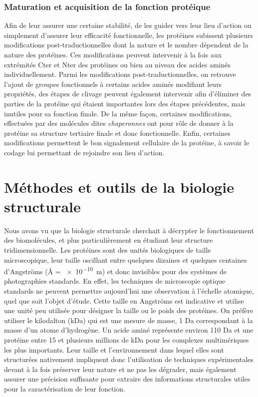 \subsubsection{Maturation et acquisition de la fonction protéique}

Afin de leur assurer une certaine stabilité, de les guider vers leur lieu d'action ou simplement d'assurer leur efficacité fonctionnelle, les protéines subissent plusieurs modifications post-traductionnelles dont la nature et le nombre dépendent de la nature des protéines. Ces modifications peuvent intervenir à la fois aux extrémités Cter et Nter des protéines ou bien au niveau des acides aminés individuellement. Parmi les modifications post-traductionnelles, on retrouve l'ajout de groupes fonctionnels à certains acides aminés modifiant leurs propriétés, des étapes de clivage peuvent également intervenir afin d'éliminer des parties de la protéine qui étaient importantes lors des étapes précédentes, mais inutiles pour sa fonction finale. De la même façon, certaines modifications, effectuées par des molécules dites \textit{chaperonnes} ont pour rôle de donner à la protéine sa structure tertiaire finale et donc fonctionnelle. Enfin, certaines modifications permettent le bon signalement cellulaire de la protéine, à savoir le codage lui permettant de rejoindre son lieu d'action.

\section{Méthodes et outils de la biologie structurale}

Nous avons vu que la biologie structurale cherchait à décrypter le fonctionnement des biomolécules, et plus particulièrement en étudiant leur structure tridimensionnelle. Les protéines sont des unités biologiques de taille microscopique, leur taille oscillant entre quelques dizaines et quelques centaines d'Angströms (\r{A} = \SI{e-10}{\metre}) et donc invisibles pour des systèmes de photographies standards. En effet, les techniques de microscopie optique standards ne peuvent permettre aujourd'hui une observation à l'échelle atomique, quel que soit l'objet d'étude. Cette taille en Angströms est indicative et utilise une unité peu utilisée pour désigner la taille ou le poids des protéines. On préfère utiliser le kilodalton (kDa) qui est une mesure de masse, 1 Da correspondant à la masse d'un atome d'hydrogène. Un acide aminé représente environ 110 Da et une protéine entre 15 et plusieurs millions de kDa pour les complexes multimériques les plus importants. Leur taille et l'environnement dans lequel elles sont structurées nativement impliquent donc l'utilisation de techniques expérimentales devant à la fois préserver leur nature et ne pas les dégrader, mais également assurer une précision suffisante pour extraire des informations structurales utiles pour la caractérisation de leur fonction.

